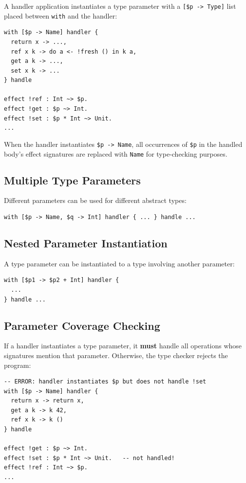 \documentclass[11pt,a4paper]{article}
\newcommand{\cba}[1]{\lstinline[style=cbainline]{#1}}
\begin{document}
A handler application instantiates a type parameter with a
\texttt{[\$p -> Type]} list placed between \cba{with} and the handler:

\begin{lstlisting}
with [$p -> Name] handler {
  return x -> ...,
  ref x k -> do a <- !fresh () in k a,
  get a k -> ...,
  set x k -> ...
} handle

effect !ref : Int ~> $p.
effect !get : $p ~> Int.
effect !set : $p * Int ~> Unit.
...
\end{lstlisting}

When the handler instantiates \texttt{\$p -> Name}, all occurrences of
\texttt{\$p} in the handled body's effect signatures are replaced with
\texttt{Name} for type-checking purposes.

\subsection{Multiple Type Parameters}

Different parameters can be used for different abstract types:

\begin{lstlisting}
with [$p -> Name, $q -> Int] handler { ... } handle ...
\end{lstlisting}

\subsection{Nested Parameter Instantiation}

A type parameter can be instantiated to a type involving another parameter:

\begin{lstlisting}
with [$p1 -> $p2 + Int] handler {
  ...
} handle ...
\end{lstlisting}

\subsection{Parameter Coverage Checking}

If a handler instantiates a type parameter, it \textbf{must} handle all
operations whose signatures mention that parameter.  Otherwise, the type
checker rejects the program:

\begin{lstlisting}
-- ERROR: handler instantiates $p but does not handle !set
with [$p -> Name] handler {
  return x -> return x,
  get a k -> k 42,
  ref x k -> k ()
} handle

effect !get : $p ~> Int.
effect !set : $p * Int ~> Unit.   -- not handled!
effect !ref : Int ~> $p.
...
\end{lstlisting}
\end{document}
